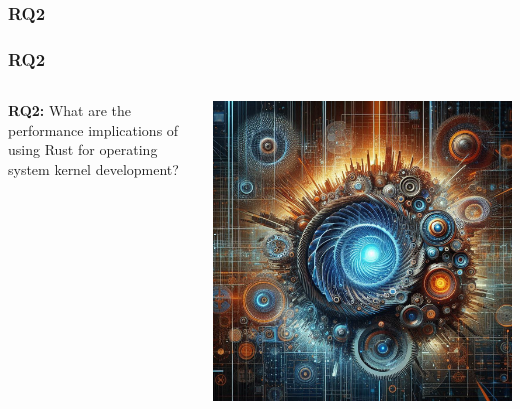 \documentclass{beamer}
\begin{document}
\subsubsection{RQ2}
\begin{frame}
  \frametitle{RQ2}
    \begin{columns}
      \begin{column}{0.5\textwidth}
        \textbf{RQ2:} What are the performance implications of using Rust for operating system kernel development?
    \end{column}
    \begin{column}{0.5\textwidth}
      \includegraphics[width=.8\textwidth]{images/rq2.jpeg}
    \end{column}
  \end{columns}
\end{frame}
\end{document}
